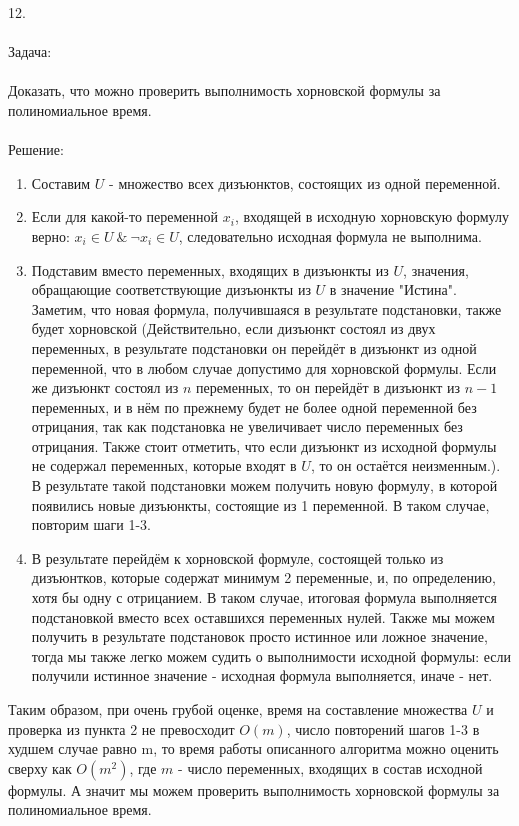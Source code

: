 \documentclass[12pt, a4paper]{article}
\begin{document}
12. \\ \\
Задача: \\ \\
Доказать, что можно проверить выполнимость хорновской формулы за 
полиномиальное время. \\ \\
Решение:

\begin{enumerate}
    \item Составим $U$ - множество всех дизъюнктов, состоящих из одной переменной.
    \item Если для какой-то переменной $x_i$, входящей в исходную хорновскую формулу
        верно: $x_i \in U ~ \& ~ \neg x_i \in U $, следовательно исходная формула не выполнима.
    \item Подставим вместо переменных, входящих в дизъюнкты из $U$, значения, обращающие 
        соответствующие дизъюнкты из $U$ в значение "Истина". Заметим, что новая формула, 
        получившаяся в результате подстановки, также будет хорновской (Действительно, если 
        дизъюнкт состоял из двух переменных, в результате подстановки он перейдёт в дизъюнкт из
        одной переменной, что в любом случае допустимо для хорновской формулы. Если же дизъюнкт
        состоял из $n$ переменных, то он перейдёт в дизъюнкт из $n-1$ переменных, и в нём по прежнему
        будет не более одной переменной без отрицания, так как подстановка не увеличивает число 
        переменных без отрицания. Также стоит отметить, что если дизъюнкт из исходной формулы не 
        содержал переменных, которые входят в $U$, то он остаётся неизменным.). В результате
        такой подстановки можем получить новую формулу, в которой появились новые дизъюнкты, 
        состоящие из 1 переменной. В таком случае, повторим шаги 1-3.
    \item В результате перейдём к хорновской формуле, состоящей только из дизъюнтков,
        которые содержат минимум 2 переменные, и, по определению, хотя бы одну с отрицанием.
        В таком случае, итоговая формула выполняется подстановкой вместо всех оставшихся переменных
        нулей. Также мы можем получить в результате подстановок просто истинное или ложное
        значение, тогда мы также легко можем судить о выполнимости исходной формулы: если 
        получили истинное значение - исходная формула выполняется, иначе - нет.

\end{enumerate}

Таким образом, при очень грубой оценке, время на составление множества $U$ и проверка из пункта
 2 не превосходит $O(m)$,
число повторений шагов 1-3 в худшем случае равно m, то время работы описанного алгоритма
можно оценить сверху как $O(m^2)$, где $m$ - 
число переменных, входящих в состав исходной формулы. А значит мы можем проверить выполнимость
хорновской формулы за полиномиальное время.
\end{document}
